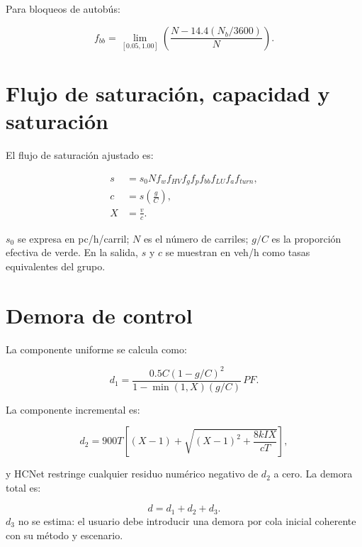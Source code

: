 \documentclass[11pt,letterpaper,oneside,openany]{report}
\begin{document}
Para bloqueos de autobús:

\begin{equation}
f_{bb}=\operatorname{lim}_{[0.05,1.00]}
\left(\frac{N-14.4(N_b/3600)}{N}\right).
\end{equation}

\section{Flujo de saturación, capacidad y saturación}

El flujo de saturación ajustado es:

\begin{equationbox}
\begin{align}
s &= s_0N f_w f_{HV}f_gf_pf_{bb}f_{LU}f_af_{turn}, \\
c &= s\left(\frac{g}{C}\right), \\
X &= \frac{v}{c}.
\end{align}
\end{equationbox}

$s_0$ se expresa en pc/h/carril; $N$ es el número de carriles; $g/C$ es la
proporción efectiva de verde. En la salida, $s$ y $c$ se muestran en veh/h como
tasas equivalentes del grupo.

\section{Demora de control}

La componente uniforme se calcula como:

\begin{equation}
d_1=\frac{0.5C(1-g/C)^2}{1-\min(1,X)(g/C)}\,PF.
\end{equation}

La componente incremental es:

\begin{equation}
d_2=900T\left[(X-1)+
\sqrt{(X-1)^2+\frac{8kIX}{cT}}\right],
\end{equation}

y HCNet restringe cualquier residuo numérico negativo de $d_2$ a cero. La demora
total es:

\begin{equationbox}
\begin{equation}
d=d_1+d_2+d_3.
\end{equation}
$d_3$ no se estima: el usuario debe introducir una demora por cola inicial
coherente con su método y escenario.
\end{equationbox}
\end{document}
